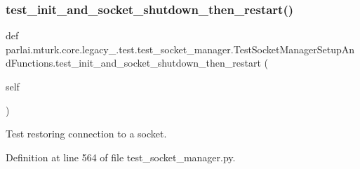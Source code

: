 \subsubsection{\texorpdfstring{test\+\_\+init\+\_\+and\+\_\+socket\+\_\+shutdown\+\_\+then\+\_\+restart()}{test\_init\_and\_socket\_shutdown\_then\_restart()}}
{\footnotesize\ttfamily def parlai.\+mturk.\+core.\+legacy\+\_.\+test.\+test\+\_\+socket\+\_\+manager.\+Test\+Socket\+Manager\+Setup\+And\+Functions.\+test\+\_\+init\+\_\+and\+\_\+socket\+\_\+shutdown\+\_\+then\+\_\+restart (\begin{DoxyParamCaption}\item[{}]{self }\end{DoxyParamCaption})}

\begin{DoxyVerb}Test restoring connection to a socket.
\end{DoxyVerb}
 

Definition at line 564 of file test\+\_\+socket\+\_\+manager.\+py.


